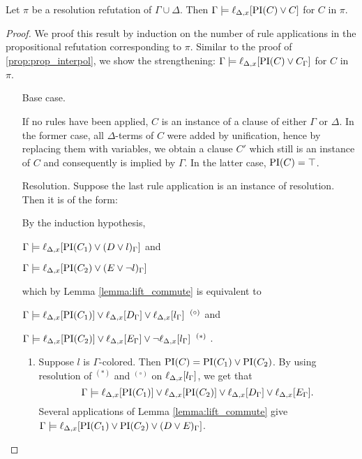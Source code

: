 \begin{lemma}
	\label{lemma:gamma_entails_lifted_interpolant}
	Let $\pi$ be a resolution refutation of $\Gamma \cup \Delta$. 
	Then $\Gamma \entails \lift{\Delta}{ \PI(C) \lor C }{x} $ for $C$ in $\pi$.
\end{lemma}
\begin{proof}
	We proof this result by induction on the number of rule applications in the propositional refutation corresponding to $\pi$. 
	Similar to the proof of \ref{prop:prop_interpol}, we show the strengthening:
	$\Gamma \entails \lift{\Delta}{ \PI(C) \lor C_\Gamma }{x} $ for $C$ in $\pi$.

	\begin{itemize}

			\newcommand{\lif}[1]{\lift{\Delta}{#1}{x}}
		\item[Base case.]

			If no rules have been applied, $C$ is an instance of a clause of either $\Gamma$ or $\Delta$.
			In the former case, all $\Delta$-terms of $C$ were added by unification, hence by replacing them with variables, we obtain a clause $C'$ which still is an instance of $C$ and consequently is implied by $\Gamma$. 
			In the latter case, $\PI(C) = \top$. 

		\item[Resolution.] Suppose the last rule application is an instance of resolution. Then it is of the form:
			\begin{prooftree}
			\end{prooftree}

			By the induction hypothesis,

			$\Gamma \entails \lift{\Delta}{ \PI(C_1) \lor (D \lor l)_\Gamma }{x}$ and

			$\Gamma \entails \lift{\Delta}{ \PI(C_2) \lor (E \lor \lnot l)_\Gamma }{x}$

			which by Lemma \ref{lemma:lift_commute} is equivalent to

			$\Gamma \entails \lift{\Delta}{ \PI(C_1) }{x} \lor
			\lift{\Delta}{ D_\Gamma }{x} \lor
			\lift{\Delta}{ l_\Gamma }{x} \;\; ^{(\circ)} $
			and

			$\Gamma \entails \lift{\Delta}{ \PI(C_2) }{x} \lor
			\lift{\Delta}{ E_\Gamma }{x} \lor
			\lnot \lift{\Delta}{ l_\Gamma }{x} \;\; ^{(*)}$ .


			\begin{enumerate}
				\item Suppose $l$ is $\Gamma$-colored.
					Then $\PI(C) = \PI(C_1) \lor \PI(C_2)$.
					By using resolution of $^{(*)}$ and $^{(\circ)}$ on $\lift{\Delta}{l_\Gamma}{x}$, we get that 
					$$\Gamma \entails\lift{\Delta}{ \PI(C_1) }{x} \lor \lift{\Delta}{ \PI(C_2) }{x} \lor
					\lift{\Delta}{ D_\Gamma }{x} \lor
					\lift{\Delta}{ E_\Gamma }{x}.$$
					Several applications of Lemma \ref{lemma:lift_commute} give
					$\Gamma \entails\lift{\Delta}{ \PI(C_1)  \lor  \PI(C_2) \lor (D \lor E)_\Gamma }{x}$.


\end{enumerate}
\end{itemize}
\end{proof}
